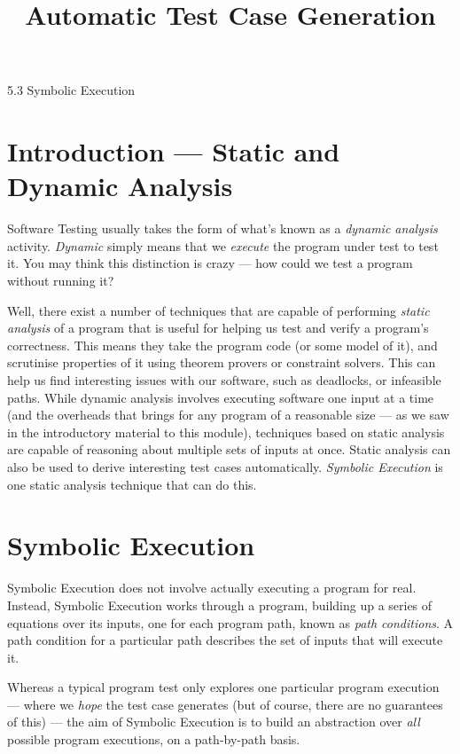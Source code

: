 



\title{Automatic Test Case Generation}{5.3 Symbolic Execution}

\section{Introduction --- Static and Dynamic Analysis}

Software Testing usually takes the form of what's known as a {\it dynamic
analysis} activity. {\it Dynamic} simply means that we {\it execute} the program
under test to test it. You may think this distinction is crazy --- how could we
test a program without running it? 

Well, there exist a number of techniques that are capable of performing {\it
static analysis} of a program that is useful for helping us test and verify a
program's correctness. This means they take the program code (or some model of
it), and scrutinise properties of it using theorem provers or constraint
solvers. This can help us find interesting issues with our software, such as
deadlocks, or infeasible paths. While dynamic analysis involves executing
software one input at a time (and the overheads that brings for any program of a
reasonable size --- as we saw in the introductory material to this module),
techniques based on static analysis are capable of reasoning about multiple sets
of inputs at once. Static analysis can also be used to derive interesting test
cases automatically. {\it Symbolic Execution} is one static analysis technique
that can do this.

\section{Symbolic Execution}

Symbolic Execution does not involve actually executing a program for real.
Instead, Symbolic Execution works through a program, building up a series of
equations over its inputs, one for each program path, known as {\it path
conditions}. A path condition for a particular path describes the set of inputs
that will execute it.

Whereas a typical program test only explores one particular program execution
--- where we {\it hope} the test case generates (but of course, there are no
guarantees of this) --- the aim of Symbolic Execution is to build an abstraction
over {\it all} possible program executions, on a path-by-path basis.

